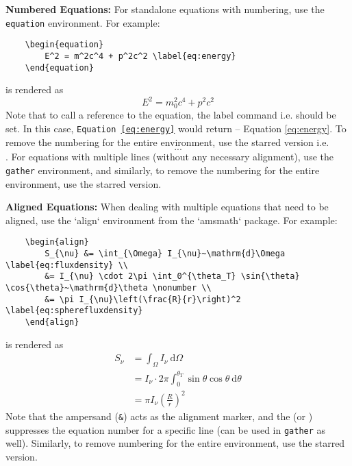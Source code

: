 \documentclass{umalayathesis}
\begin{document}
\textbf{Numbered Equations:} For standalone equations with numbering, use the \texttt{equation} environment. For example:
\begin{verbatim}
    \begin{equation}
        E^2 = m^2c^4 + p^2c^2 \label{eq:energy}
    \end{equation}
\end{verbatim}
is rendered as 
\begin{equation}
    E^2 = m_0^2c^4 + p^2c^2 \label{eq:energy}
\end{equation}
Note that to call a reference to the equation, the label command i.e. \texttt{\label{...}} should be set. In this case, \texttt{Equation \ref{eq:energy}} would return -- Equation \ref{eq:energy}. To remove the numbering for the entire environment, use the starred version i.e. \texttt{\begin{equation*}...\end{equation*}}. For equations with multiple lines (without any necessary alignment), use the \texttt{gather} environment, and similarly, to remove the numbering for the entire environment, use the starred version. 

\textbf{Aligned Equations:} When dealing with multiple equations that need to be aligned, use the `align` environment from the `amsmath` package. For example:
\begin{verbatim}
    \begin{align}
        S_{\nu} &= \int_{\Omega} I_{\nu}~\mathrm{d}\Omega \label{eq:fluxdensity} \\
        &= I_{\nu} \cdot 2\pi \int_0^{\theta_T} \sin{\theta} \cos{\theta}~\mathrm{d}\theta \nonumber \\
        &= \pi I_{\nu}\left(\frac{R}{r}\right)^2 \label{eq:spherefluxdensity}
    \end{align}
\end{verbatim}
is rendered as
\begin{align}
    S_{\nu} &= \int_{\Omega} I_{\nu}~\mathrm{d}\Omega \label{eq:fluxdensity} \\
    &= I_{\nu} \cdot 2\pi \int_0^{\theta_T} \sin{\theta} \cos{\theta}~\mathrm{d}\theta \nonumber \\
    &= \pi I_{\nu}\left(\frac{R}{r}\right)^2 \label{eq:spherefluxdensity}
\end{align}
Note that the ampersand (\texttt{&}) acts as the alignment marker, and the \texttt{\nonumber} (or \texttt{\notag}) suppresses the equation number for a specific line (can be used in \texttt{gather} as well). Similarly, to remove numbering for the entire environment, use the starred version.
\end{document}
